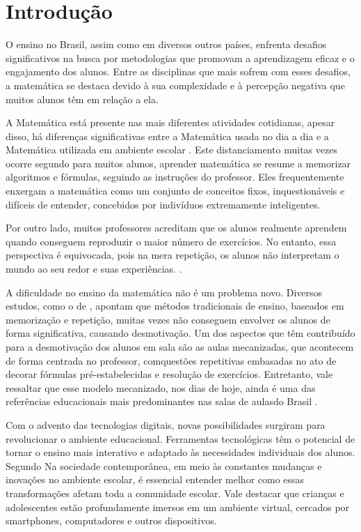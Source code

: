 \chapter{Introdução}\label{chp:intro}

O ensino no Brasil, assim como em diversos outros países, enfrenta desafios significativos na busca por metodologias que promovam a aprendizagem eficaz e o engajamento dos alunos. Entre as disciplinas que mais sofrem com esses desafios, a matemática se destaca devido à sua complexidade e à percepção negativa que muitos alunos têm em relação a ela.

A Matemática está presente nas mais diferentes atividades cotidianas, apesar disso, há diferenças  significativas  entre  a  Matemática  usada  no  dia  a  dia  e  a Matemática utilizada  em ambiente   escolar \cite{barbosa2020utilizacao}. Este distanciamento muitas vezes ocorre segundo \cite{goes2023ensino} para muitos alunos, aprender matemática se resume a memorizar algoritmos e fórmulas, seguindo as instruções do professor. Eles frequentemente enxergam a matemática como um conjunto de conceitos fixos, inquestionáveis e difíceis de entender, concebidos por indivíduos extremamente inteligentes. 

Por outro lado, muitos professores acreditam que os alunos realmente aprendem quando conseguem reproduzir o maior número de exercícios. No entanto, essa perspectiva é equivocada, pois na mera repetição, os alunos não interpretam o mundo ao seu redor e suas experiências. \cite{goes2023ensino}.

A dificuldade no ensino da matemática não é um problema novo. Diversos estudos, como o de  \cite{boaler2015s}, apontam que métodos tradicionais de ensino, baseados em memorização e repetição, muitas vezes não conseguem envolver os alunos de forma significativa, causando desmotivação. Um dos aspectos que têm contribuído para a desmotivação dos alunos em sala são as aulas  mecanizadas,  que  acontecem  de  forma  centrada  no  professor,  comquestões  repetitivas embasadas no ato de decorar fórmulas pré-estabelecidas e resolução de exercícios. Entretanto, vale  ressaltar  que  esse  modelo  mecanizado,  nos  dias  de  hoje,  ainda  é  uma  das  referências educacionais mais predominantes nas salas de aulasdo Brasil \cite{da2017contributo}.

Com o advento das tecnologias digitais, novas possibilidades surgiram para revolucionar o ambiente educacional. Ferramentas tecnológicas têm o potencial de tornar o ensino mais interativo e adaptado às necessidades individuais dos alunos. Segundo \cite{barbosa2020utilizacao} Na sociedade contemporânea, em meio às constantes mudanças e inovações no ambiente escolar, é essencial entender melhor como essas transformações afetam toda a comunidade escolar. Vale destacar que crianças e adolescentes estão profundamente imersos em um ambiente virtual, cercados por smartphones, computadores e outros dispositivos.

